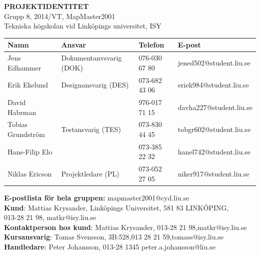 \documentclass[a4paper,12pt,fleqn]{article}
\begin{document}
	\vspace*{\fill}
		\begingroup
			\begin{center}
				\LARGE{\textbf{PROJEKTIDENTITET}}
				\\
				\footnotesize
				Grupp 8, 2014/VT, MapMaster2001
				\\
				Tekniska högskolan vid Linköpings universitet, ISY
				\\
				\vspace{1cm}
	  \begin{tabular}{| p{3cm} | p{4.3cm} | p{2.4cm} | p{3.8cm} |}
	    \hline
		\textbf{Namn} & \textbf{Ansvar} & \textbf{Telefon} & \textbf{E-post} \\ \hline
	    Jens Edhammer & Dokumentanvsvarig (DOK) & 076-030 67 80 & jened502@student.liu.se \\ \hline
		Erik Ekelund & Designansvarig (DES) & 073-682 43 06 & eriek984@student.liu.se \\ \hline
		David Habrman &  & 976-017 71 15 & davha227@student.liu.se \\ \hline 
		Tobias Grundström & Testansvarig (TES) & 073-830 44 45 & tobgr602@student.liu.se \\ \hline 
		Hans-Filip Elo &   & 073-385 22 32 & hanel742@student.liu.se \\ \hline 
		Niklas Ericson & Projektledare (PL) & 073-052 27 05 & niker917@student.liu.se \\ \hline
	    \end{tabular}
		
		\vspace{1cm}
		\textbf{E-postlista för hela gruppen:} mapmaster2001@cyd.liu.se
		\\[0.5cm]
		
		\textbf{Kund}: Mattias Krysander, Linköpings Universitet, 581 83  LINKÖPING, \\
		013-28 21 98, matkr@isy.liu.se \\
		\textbf{Kontaktperson hos kund}: Mattias Krysander, 013-28 21 98,matkr@isy.liu.se 
		\\
		\textbf{Kursansvarig}: Tomas Svensson, 3B:528,013 28 21 59,tomass@isy.liu.se
		\\[0.5cm]
		\textbf{Handledare}: Peter Johansson, 013-28 1345 peter.a.johansson@liu.se

				\end{center}
		\endgroup
	\vspace*{\fill}
\newpage

\end{document}
